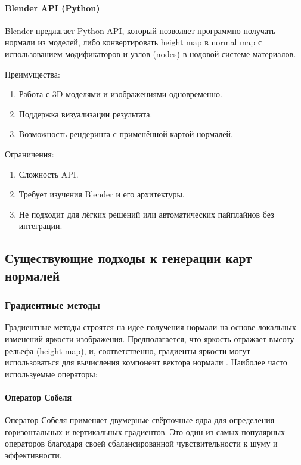 \paragraph{Blender API (Python)}

Blender предлагает Python API, который позволяет программно получать нормали из моделей, либо конвертировать height map в normal map с использованием модификаторов и узлов (nodes) в нодовой системе материалов.

Преимущества:
\begin{enumerate}
	\item Работа с 3D-моделями и изображениями одновременно.
	\item Поддержка визуализации результата.
	\item Возможность рендеринга с применённой картой нормалей.
\end{enumerate}

Ограничения:
\begin{enumerate}
	\item Сложность API.
	\item Требует изучения Blender и его архитектуры.
	\item Не подходит для лёгких решений или автоматических пайплайнов без интеграции.
\end{enumerate}

\subsection{Существующие подходы к генерации карт нормалей}
\subsubsection{Градиентные методы}

Градиентные методы строятся на идее получения нормали на основе локальных изменений яркости изображения. Предполагается, что яркость отражает высоту рельефа (height map), и, соответственно, градиенты яркости могут использоваться для вычисления компонент вектора нормали \cite{yane2021}. Наиболее часто используемые операторы:
\paragraph{Оператор Собеля}

Оператор Собеля применяет двумерные свёрточные ядра для определения горизонтальных и вертикальных градиентов. Это один из самых популярных операторов благодаря своей сбалансированной чувствительности к шуму и эффективности.

